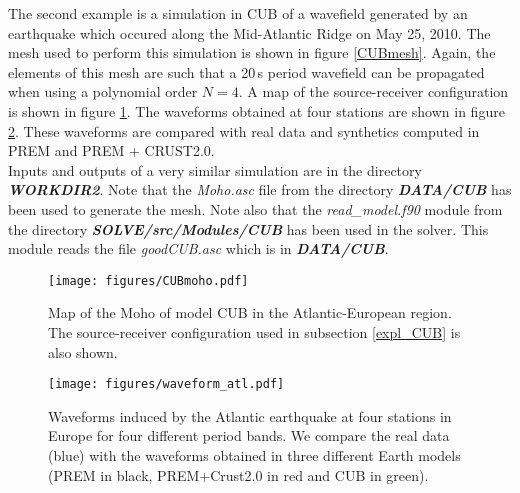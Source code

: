 The second example is a simulation in CUB  of a wavefield generated by an earthquake which
occured along the Mid-Atlantic Ridge on May 25, 2010. The mesh used to perform this simulation is shown in
figure \ref{CUBmesh}. Again, the elements of this mesh are such that a 20\,s period wavefield can be
propagated when using a polynomial order $N=4$. A map of the source-receiver configuration is shown in figure
\ref{CUBmoho}. The waveforms obtained at four stations are shown in figure \ref{waveCUB}. These waveforms are
compared with real data and synthetics computed in PREM and PREM + CRUST2.0.\\
Inputs and outputs of a very similar simulation are in the directory \textit{\bfseries WORKDIR2}. Note that
the \textit{Moho.asc} file from the directory \textit{\bfseries DATA/CUB} has been used to generate the mesh.
Note also that the \textit{read\_model.f90} module from the directory \textit{\bfseries SOLVE/src/Modules/CUB}
has been used in the solver. This module reads the file \textit{goodCUB.asc} which is in
\textit{\bfseries DATA/CUB}.

\begin{figure}
\centerline{\texttt{[image: figures/CUBmoho.pdf]}}
\caption{Map of the Moho of model CUB in the Atlantic-European region. The
source-receiver configuration used in subsection \ref{expl_CUB} is also shown.}
\label{CUBmoho}
\end{figure}

\begin{figure}
\hspace{0.5cm}
\centerline{\texttt{[image: figures/waveform\_atl.pdf]}}
\caption{Waveforms induced by the Atlantic earthquake at four stations in Europe
for four different period bands. We compare the real data (blue) with the
waveforms obtained in three different Earth models (PREM in black, PREM+Crust2.0
in red and CUB in green).}
\label{waveCUB}
\end{figure}
